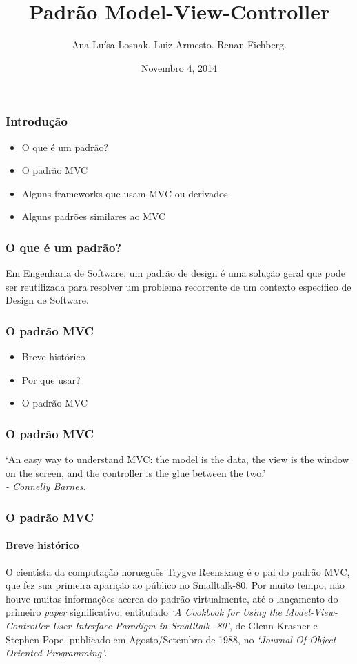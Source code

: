 \documentclass{beamer}
\title[Padrão Model-View-Controller]{Padrão Model-View-Controller}
\author{Ana Luísa Losnak. Luiz Armesto. Renan Fichberg.}
\date{Novembro 4, 2014}
\institute{Instituto de Matemática e Estatística da Universidade de São Paulo (IME-USP)}
\begin{document}
\begin{frame}
\titlepage
\end{frame}

\begin{frame}
\frametitle{Introdução}
\begin{itemize}
	\item O que é um padrão?
	\item O padrão MVC
	\item Alguns frameworks que usam MVC ou derivados.
	\item Alguns padrões similares ao MVC
\end{itemize}
\end{frame}

\begin{frame}
\frametitle{O que é um padrão?}
	Em Engenharia de Software, um padrão de design é uma solução geral que pode ser reutilizada para resolver um problema recorrente de um contexto específico de Design de Software.
\end{frame}

\begin{frame}
\frametitle{O padrão MVC}
\begin{itemize}
	\item Breve histórico
	\item Por que usar?
	\item O padrão MVC
\end{itemize}
\end{frame}

\begin{frame}
\frametitle{O padrão MVC}
	`An easy way to understand MVC: the model is the data, the view is the window on the screen, and the controller is the glue between the two.' \\
	\hfill \textit{- Connelly Barnes.}
\end{frame}


\begin{frame}
\frametitle{O padrão MVC}
\framesubtitle{Breve histórico}
	O cientista da computação norueguês Trygve Reenskaug é o pai do padrão MVC, que fez sua primeira aparição ao público no Smalltalk-80. Por muito tempo, não houve
	muitas informações acerca do padrão virtualmente, até o lançamento do primeiro \textit{paper} significativo, entitulado \textit{`A Cookbook for Using the Model-View-Controller User Interface Paradigm in Smalltalk -80'}, de Glenn Krasner e Stephen Pope, publicado em Agosto/Setembro de 1988, no \textit{`Journal Of Object Oriented Programming'}.
\end{frame}
\end{document}

